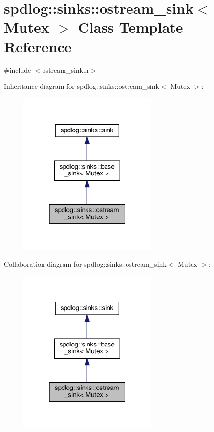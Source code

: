 \hypertarget{classspdlog_1_1sinks_1_1ostream__sink}{}\section{spdlog\+:\+:sinks\+:\+:ostream\+\_\+sink$<$ Mutex $>$ Class Template Reference}
\label{classspdlog_1_1sinks_1_1ostream__sink}


{\ttfamily \#include $<$ostream\+\_\+sink.\+h$>$}



Inheritance diagram for spdlog\+:\+:sinks\+:\+:ostream\+\_\+sink$<$ Mutex $>$\+:
\nopagebreak
\begin{figure}[H]
\begin{center}
\leavevmode
\includegraphics[width=196pt]{classspdlog_1_1sinks_1_1ostream__sink__inherit__graph}
\end{center}
\end{figure}


Collaboration diagram for spdlog\+:\+:sinks\+:\+:ostream\+\_\+sink$<$ Mutex $>$\+:
\nopagebreak
\begin{figure}[H]
\begin{center}
\leavevmode
\includegraphics[width=196pt]{classspdlog_1_1sinks_1_1ostream__sink__coll__graph}
\end{center}
\end{figure}
